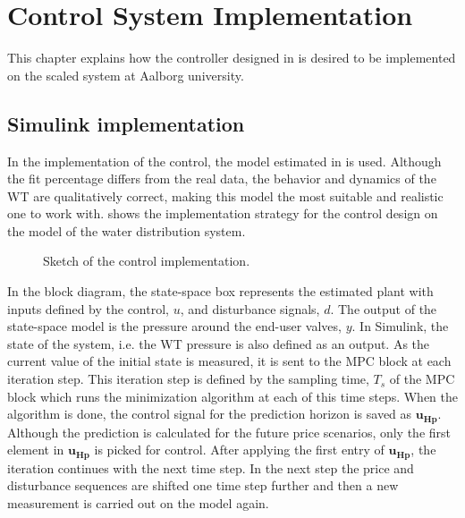 \chapter{Control System Implementation}
\label{implementation_of_controller}

This chapter explains how the controller designed in  is desired to be implemented on the scaled system at Aalborg university.  

\section{Simulink implementation}
\label{simulink_intro}
In the implementation of the control, the model estimated in  is used. Although the fit percentage differs from the real data, the behavior and dynamics of the WT are qualitatively correct, making this model the most suitable and realistic one to work with.  shows the implementation strategy for the control design on the model of the water distribution system.

\begin{figure}[H]
\centering
 
\caption{Sketch of the control implementation.}
\label{fig:control_sketch}
\end{figure}

In the block diagram, the state-space box represents the estimated plant with inputs defined by the control, $u$, and disturbance signals, $d$. The output of the state-space model is the pressure around the end-user valves, $y$. In Simulink, the state of the system, i.e. the WT pressure is also defined as an output. As the current value of the initial state is measured, it is sent to the MPC block at each iteration step. This iteration step is defined by the sampling time, $T_s$ of the MPC block which runs the minimization algorithm at each of this time steps. When the algorithm is done, the control signal for the prediction horizon is saved as $\bm{u_{Hp}}$. Although the prediction is calculated for the future price scenarios, only the first element in $\bm{u_{Hp}}$ is picked for control. After applying the first entry of $\bm{u_{Hp}}$, the iteration continues with the next time step. In the next step the price and disturbance sequences are shifted one time step further and then a new measurement is carried out on the model again.

